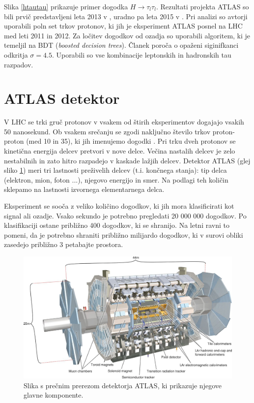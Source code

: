 \documentclass[11pt,a4paper,openany]{book}
\begin{document}
Slika \ref{htautau} prikazuje primer dogodka $H \rightarrow \tau_l\tau_l$. Rezultati projekta ATLAS so bili prvič predstavljeni leta 2013 v \cite{atlas2013}, uradno pa leta 2015 v \cite{atlas2015htautau}. Pri analizi so avtorji uporabili poln set trkov protonov, ki jih je eksperiment ATLAS posnel na LHC med leti 2011 in 2012. Za ločitev dogodkov od ozadja so uporabili algoritem, ki je temeljil na BDT (\textit{boosted decision trees}). Članek poroča o opaženi siginifkanci odkritja $\sigma = 4.5$. Uporabili so vse kombinacije leptonskih in hadronskih tau razpadov.

\section{ATLAS detektor}
\label{sec:atlasdetector}
V LHC se trki gruč protonov v vsakem od štirih eksperimentov dogajajo vsakih 50 nanosekund. Ob vsakem srečanju se zgodi naključno število trkov proton-proton (med 10 in 35), ki jih imenujemo dogodki \cite{ChallengeDoc}. Pri trku dveh protonov se kinetična energija delcev pretvori v nove delce. Večina nastalih delcev je zelo nestabilnih in zato hitro razpadejo v kaskade lažjih delcev. Detektor ATLAS (glej sliko \ref{detektoratlas}) meri tri lastnosti preživelih delcev (t.i. končnega stanja): tip delca (elektron, mion, foton ...), njegovo energijo in smer. Na podlagi teh količin sklepamo na lastnosti izvornega elementarnega delca.

Eksperiment se sooča z veliko količino dogodkov, ki jih mora klasificirati kot signal ali ozadje. Vsako sekundo je potrebno pregledati 20 000 000 dogodkov. Po klasifikaciji ostane približno 400 dogodkov, ki se shranijo. Na letni ravni to pomeni, da je potrebno shraniti približno milijardo dogodkov, ki v surovi obliki zasedejo približno 3 petabajte prostora.

\begin{figure}[ht]
	\includegraphics[width=16.0cm]{physics/atlas_detector.jpg}
	
	\caption{Slika s prečnim prerezom detektorja ATLAS, ki prikazuje njegove glavne komponente\cite{AadScience2012}.  }
	\label{detektoratlas}
\end{figure}
\end{document}
